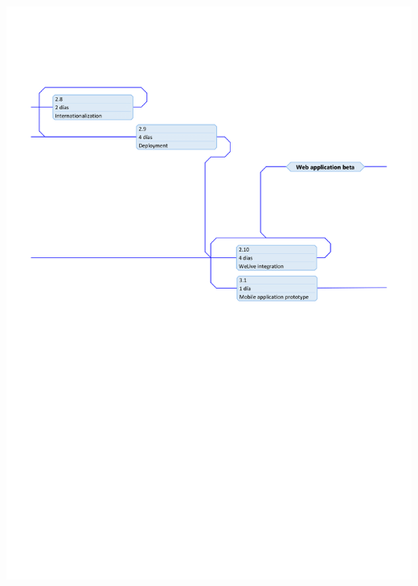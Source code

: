 \documentclass{DeustoFDP}
\begin{document}
\begin{center}
	\includegraphics[width=1\linewidth]{fig/precedence-3}
\end{center}
\end{document}
